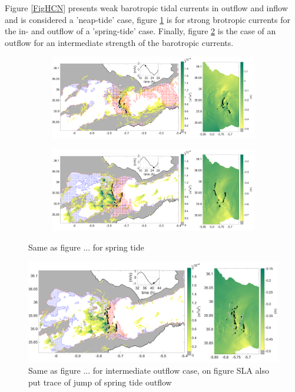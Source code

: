 Figure \ref{FigHCN} presents weak barotropic tidal currents in outflow and inflow and is considered a 'neap-tide' case, figure \ref{FigHCS} is for strong brotropic currents for the in- and outflow of a 'spring-tide' case. Finally, figure \ref{FigHCI} is the case of an outflow for an intermediate strength of the barotropic currents.

\begin{figure}[!h]
 \centering
\begin{subfigure}{\linewidth}
\centering
\includegraphics[width=\linewidth]{./GBR3D/VE2_19h30_p.png}
\end{subfigure}

\begin{subfigure}{\linewidth}
\centering
\includegraphics[width=\linewidth]{./GBR3D/VE2_25h_p.png}
\end{subfigure}
\caption {Same as figure ... for spring tide}
\label{FigHCS}
\end{figure}

\begin{figure}[!h]
 \centering
\includegraphics[width=\linewidth]{./GBR3D/IES_41h_p.png}
 \caption {Same as figure ... for intermediate outflow case, on figure SLA also put trace of jump of spring tide outflow}
 \label{FigHCI}
\end{figure}

